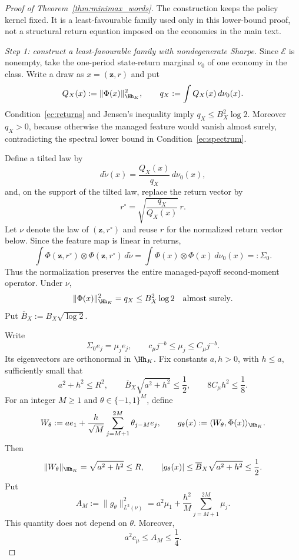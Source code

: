 \begin{proof}[Proof of Theorem~\ref{thm:minimax_words}]
The construction keeps the policy kernel fixed. It is a least-favourable family
used only in this lower-bound proof, not a structural return equation imposed on
the economies in the main text.

\medskip
\noindent\textit{Step 1: construct a least-favourable family with nondegenerate Sharpe.}
Since $\mathcal E$ is nonempty, take the one-period state-return marginal
$\nu_0$ of one economy in the class. Write a draw as
$x=(\mathbf z,r)$ and put
\[
Q_X(x):=\|\Phi(x)\|_{\Hh_K}^2,
\qquad
q_X:=\int Q_X(x)\,d\nu_0(x).
\]
Condition~\ref{ec:returns} and Jensen's inequality imply
$q_X\leq B_X^2\log2$. Moreover $q_X>0$, because otherwise the managed
feature would vanish almost surely, contradicting the spectral lower bound
in Condition~\ref{ec:spectrum}.

Define a tilted law by
\[
d\widetilde\nu(x)
=
\frac{Q_X(x)}{q_X}\,d\nu_0(x),
\]
and, on the support of the tilted law, replace the return vector by
\[
r^\circ
=
\sqrt{\frac{q_X}{Q_X(x)}}\,r.
\]
Let $\nu$ denote the law of $(\mathbf z,r^\circ)$ and reuse $r$ for the
normalized return vector below. Since the feature map is linear in returns,
\[
\int \Phi(\mathbf z,r^\circ)\otimes\Phi(\mathbf z,r^\circ)\,d\widetilde\nu
=
\int \Phi(x)\otimes\Phi(x)\,d\nu_0(x)
=:\Sigma_0.
\]
Thus the normalization preserves the entire managed-payoff second-moment
operator. Under $\nu$,
\[
\|\Phi(x)\|_{\Hh_K}^2=q_X\leq B_X^2\log2
\quad\text{almost surely}.
\]
Put $\overline B_X:=B_X\sqrt{\log2}$.

Write
\[
\Sigma_0e_j=\mu_je_j,
\qquad
c_\mu j^{-b}\leq\mu_j\leq C_\mu j^{-b}.
\]
Its eigenvectors are orthonormal in $\Hh_K$. Fix constants $a,h>0$,
with $h\leq a$, sufficiently small that
\[
a^2+h^2\leq R^2,
\qquad
\overline B_X\sqrt{a^2+h^2}\leq\frac12,
\qquad
8C_\mu h^2\leq\frac18.
\]
For an integer $M\geq1$ and $\theta\in\{-1,1\}^M$, define
\[
W_\theta
:=
a e_1
+
\frac{h}{\sqrt M}
\sum_{j=M+1}^{2M}\theta_{j-M}e_j,
\qquad
g_\theta(x)
:=
\langle W_\theta,\Phi(x)\rangle_{\Hh_K}.
\]
Then
\[
\|W_\theta\|_{\Hh_K}=\sqrt{a^2+h^2}\leq R,
\qquad
|g_\theta(x)|\leq \overline B_X\sqrt{a^2+h^2}\leq\frac12.
\]
Put
\[
A_M
:=
\|g_\theta\|_{L^2(\nu)}^2
=
a^2\mu_1
+
\frac{h^2}{M}
\sum_{j=M+1}^{2M}\mu_j.
\]
This quantity does not depend on $\theta$. Moreover,
\[
a^2c_\mu\leq A_M\leq\frac14.
\]


\end{proof}
